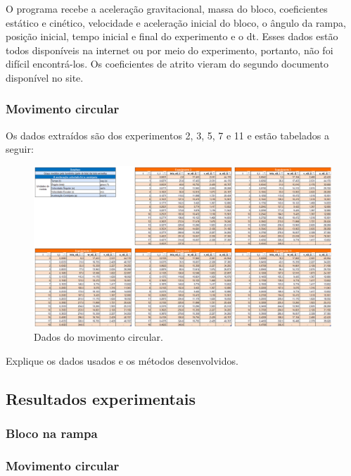 \documentclass{article}
\begin{document}
\qquad O programa recebe a aceleração gravitacional, massa do bloco, coeficientes estático e cinético, velocidade e aceleração inicial do bloco, o ângulo da rampa, posição inicial, tempo inicial e final do experimento e o dt. Esses dados estão todos disponíveis na internet ou por meio do experimento, portanto, não foi difícil encontrá-los. Os coeficientes de atrito vieram do segundo documento disponível no site.



\subsubsection{Movimento circular}
\qquad Os dados extraídos são dos experimentos 2, 3, 5, 7 e 11 e estão tabelados a seguir:


\begin{figure}[!h]
    \centering
    \includegraphics[width=16cm]{./img/tabelas_movimento_circular.png}
    \caption{Dados do movimento circular.}
\end{figure}


\qquad
Explique os dados usados e os métodos desenvolvidos.

\subsection{Resultados experimentais}

\subsubsection{Bloco na rampa}

\subsubsection{Movimento circular}
\end{document}
